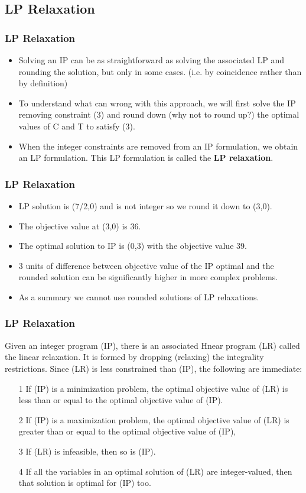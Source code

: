 \documentclass{beamer}
\begin{document}
\subsection{LP Relaxation}
\begin{frame}
\frametitle{LP Relaxation}
\begin{itemize}
\item 
Solving an IP can be as straightforward as solving the associated LP
and rounding the solution, but only in some cases. (i.e. by coincidence rather than by definition)
\item To understand what can wrong with this approach, we will first solve the IP
removing constraint (3) and round down (why not to round up?) the optimal values of C and T to satisfy
(3). 
\item When the integer constraints are removed from an IP formulation, we obtain an LP formulation. This
LP formulation is called the \textbf{LP relaxation}.
\end{itemize}
\end{frame}
\begin{frame}
	\frametitle{LP Relaxation}
	\begin{itemize}
\item LP solution is (7/2,0) and is not integer so we round it down to (3,0). 
\item The objective value at (3,0) is
36. 
\item The optimal solution to IP is (0,3) with the objective value 39. 
\item 3 units of difference between objective
value of the IP optimal and the rounded solution can be significantly higher in more complex problems.
\item As
a summary we cannot use rounded solutions of LP relaxations.
	\end{itemize}
\end{frame}
\begin{frame}
\frametitle{LP Relaxation}
Given an integer program (IP), there is an associated Hnear program (LR)
called the linear relaxation. It is formed by dropping (relaxing) the integrality
restrictions. Since (LR) is less constrained than (IP), the following are immediate:
\begin{itemize}
\item[1] If (IP) is a minimization problem, the optimal objective value of (LR) is
less than or equal to the optimal objective value of (IP).
\item[2] If (IP) is a maximization problem, the optimal objective value of (LR) is
greater than or equal to the optimal objective value of (IP),
\item[3] If (LR) is infeasible, then so is (IP).
\item[4] If all the variables in an optimal solution of (LR) are integer-valued, then
that solution is optimal for (IP) too.
\end{itemize}
\end{frame}
\end{document}
